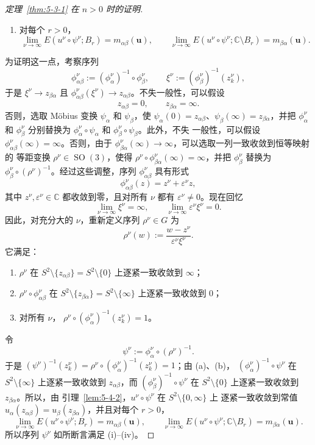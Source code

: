 \begin{proof}[定理~\ref{thm:5-3-1} 在 $n>0$ 时的证明]
\begin{enumerate}[label=(\roman*),leftmargin=3em]
\item 对每个 $r>0$，
\[
  \lim_{\nu\to\infty}E(u^\nu\circ\psi^\nu;B_r)=m_{\alpha\beta}(\mathbf u),
  \qquad
  \lim_{\nu\to\infty}E(u^\nu\circ\psi^\nu;\mathbb C\setminus B_r)
  =m_{\beta\alpha}(\mathbf u).
\]
\end{enumerate}
为证明这一点，考察序列
\[
  \phi_{\alpha\beta}^\nu
  :=(\phi_\alpha^\nu)^{-1}\circ\phi_\beta^\nu,
  \qquad
  \xi^\nu:=(\phi_\beta^\nu)^{-1}(z_k^\nu),
\]
于是 $\xi^\nu\to z_{\beta\alpha}$ 且
$\phi_{\alpha\beta}^\nu(\xi^\nu)\to z_{\alpha\beta}$。不失一般性，可以假设
\[
  z_{\alpha\beta}=0,
  \qquad z_{\beta\alpha}=\infty.
\]
否则，选取 Möbius 变换 $\psi_\alpha$ 和 $\psi_\beta$，使
$\psi_\alpha(0)=z_{\alpha\beta}$、$\psi_\beta(\infty)=z_{\beta\alpha}$，并把
$\phi_\alpha^\nu$ 和 $\phi_\beta^\nu$ 分别替换为
$\phi_\alpha^\nu\circ\psi_\alpha$ 和 $\phi_\beta^\nu\circ\psi_\beta$。此外，不失
一般性，可以假设 $\phi_{\alpha\beta}^\nu(\infty)=\infty$。否则，由于
$\phi_{\beta\alpha}^\nu(\infty)\to\infty$，可以选取一列一致收敛到恒等映射的
等距变换 $\rho^\nu\in\operatorname{SO}(3)$，使得
$\rho^\nu\circ\phi_{\beta\alpha}^\nu(\infty)=\infty$，并把 $\phi_\beta^\nu$ 替换为
$\phi_\beta^\nu\circ(\rho^\nu)^{-1}$。经过这些调整，序列
$\phi_{\alpha\beta}^\nu$ 具有形式
\[
  \phi_{\alpha\beta}^\nu(z)=z^\nu+\varepsilon^\nu z,
\]
其中 $z^\nu,\varepsilon^\nu\in\mathbb C$ 都收敛到零，且对所有 $\nu$ 都有
$\varepsilon^\nu\ne0$。现在回忆
\[
  \lim_{\nu\to\infty}\xi^\nu=\infty,
  \qquad
  \lim_{\nu\to\infty}\varepsilon^\nu\xi^\nu=0.
\]
因此，对充分大的 $\nu$，重新定义序列 $\rho^\nu\in G$ 为
\[
  \rho^\nu(w):=\frac{w-z^\nu}{\varepsilon^\nu\xi^\nu}.
\]
它满足：
\begin{enumerate}[label=(\alph*),leftmargin=3em]
\item $\rho^\nu$ 在
$S^2\setminus\{z_{\alpha\beta}\}=S^2\setminus\{0\}$ 上逐紧一致收敛到 $\infty$；
\item $\rho^\nu\circ\phi_{\alpha\beta}^\nu$ 在
$S^2\setminus\{z_{\beta\alpha}\}=S^2\setminus\{\infty\}$ 上逐紧一致收敛到 $0$；
\item 对所有 $\nu$，
$\rho^\nu\circ(\phi_\alpha^\nu)^{-1}(z_k^\nu)=1$。
\end{enumerate}
令
\[
  \psi^\nu:=\phi_\alpha^\nu\circ(\rho^\nu)^{-1}.
\]
于是 $(\psi^\nu)^{-1}(z_k^\nu)=
\rho^\nu\circ(\phi_\alpha^\nu)^{-1}(z_k^\nu)=1$；由 (a)、(b)，
$(\phi_\alpha^\nu)^{-1}\circ\psi^\nu$ 在 $S^2\setminus\{\infty\}$ 上逐紧一致收敛到
$z_{\alpha\beta}$，而 $(\phi_\beta^\nu)^{-1}\circ\psi^\nu$ 在
$S^2\setminus\{0\}$ 上逐紧一致收敛到 $z_{\beta\alpha}$。所以，由
引理~\ref{lem:5-4-2}，$u^\nu\circ\psi^\nu$ 在 $S^2\setminus\{0,\infty\}$ 上
逐紧一致收敛到常值 $u_\alpha(z_{\alpha\beta})=u_\beta(z_{\beta\alpha})$，并且对每个
$r>0$，
\[
  \lim_{\nu\to\infty}E(u^\nu\circ\psi^\nu;B_r)=m_{\alpha\beta}(\mathbf u),
  \qquad
  \lim_{\nu\to\infty}E(u^\nu\circ\psi^\nu;\mathbb C\setminus B_r)
  =m_{\beta\alpha}(\mathbf u).
\]
所以序列 $\psi^\nu$ 如所断言满足 (i)--(iv)。


\end{proof}
